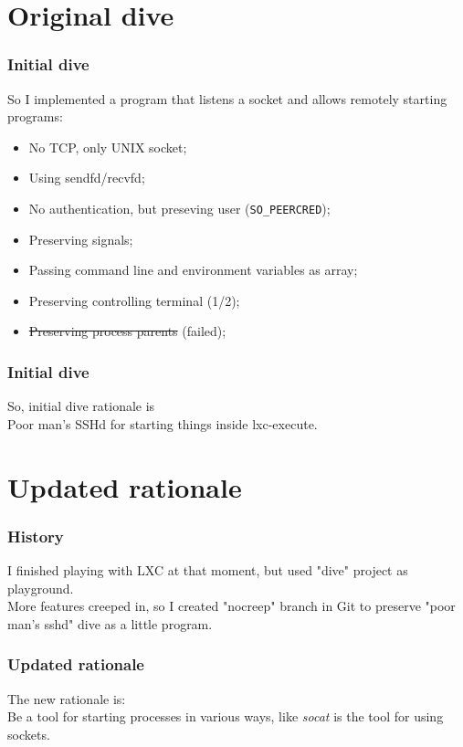 \documentclass[aspectratio=43]{beamer}
\newcommand{\C}{\lstinline}
\begin{document}
\section{Original dive}

\begin{frame}
    \frametitle{Initial dive}
    So I implemented a program that listens a socket and allows remotely starting programs:
    \begin{itemize}
        \pause \item No TCP, only UNIX socket;
        \pause \item Using sendfd/recvfd;
        \pause \item No authentication, but preseving user (\C!SO_PEERCRED!);
        \pause \item Preserving signals;
        \pause \item Passing command line and environment variables as array;
        \pause \item Preserving controlling terminal (1/2);
        \pause \item \st{Preserving process parents} (failed);
    \end{itemize}
\end{frame}

\begin{frame}
    \frametitle{Initial dive}
    So, initial dive rationale is \\
    \vfill
    \Large{Poor man's SSHd for starting things inside lxc-execute}.
\end{frame}

\section{Updated rationale}

\begin{frame}
    \frametitle{History}
    I finished playing with LXC at that moment, but used "dive" project as playground.\\
    \vfill
    \pause More features creeped in, so I created "nocreep" branch in Git to preserve "poor man's sshd" dive as a little program.
\end{frame}

\begin{frame}
    \frametitle{Updated rationale}
    The new rationale is:\\
    \vfill
    \Large{Be a tool for starting processes in various ways, like \emph{socat} is the tool for using sockets.}
\end{frame}
\end{document}

